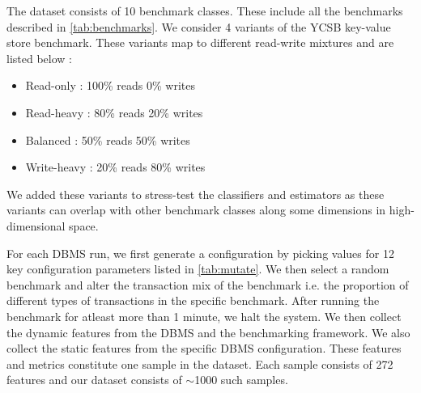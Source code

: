 The dataset consists of 10 benchmark classes. These include all the benchmarks
described in \cref{tab:benchmarks}. We consider 4 variants of the YCSB key-value
store benchmark. These variants map to different read-write mixtures and are
listed below :

\begin{itemize}
  \item {Read-only : 100\% reads 0\% writes } 
  \item {Read-heavy : 80\% reads 20\% writes } 
  \item {Balanced : 50\% reads 50\% writes } 
  \item {Write-heavy : 20\% reads 80\% writes } 
\end{itemize}

We added these variants to stress-test the classifiers and estimators as these
variants can overlap with other benchmark classes along some dimensions in
high-dimensional space. 

For each DBMS run, we first generate a configuration by picking
values for 12 key configuration parameters listed in \cref{tab:mutate}.
We then select a random benchmark and alter the transaction mix of the
benchmark i.e. the proportion of different types of transactions in 
the specific benchmark. After running the benchmark for atleast more than
1 minute, we halt the system.  We then collect the dynamic features from the
DBMS and the benchmarking framework. We also collect the static features
from the specific DBMS configuration. These features and metrics constitute
one sample in the dataset.
Each sample consists of 272 features and our dataset consists of $\sim$1000
such samples.


